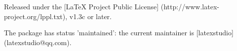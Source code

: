 Released under the [LaTeX Project Public License]
(http://www.latex-project.org/lppl.txt), v1.3c or later.

The package has status 'maintained': the current maintainer is
[latexstudio](latexstudio@qq.com).
